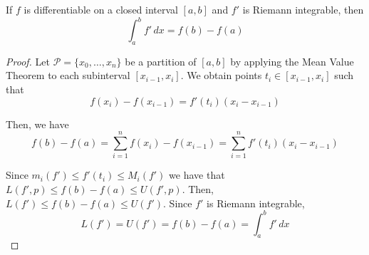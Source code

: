 \begin{theorem}
    If $f$ is differentiable on a closed interval $[a, b]$ and $f'$ is Riemann integrable, then $$\int_a^b f' \, dx = f(b) - f(a)$$
\end{theorem}
\begin{proof}
    Let $\mathcal{P} = \{x_0, \ldots, x_n\}$ be a partition of $[a, b]$ by applying the Mean Value Theorem to each subinterval $[x_{i - 1}, x_i]$. We obtain points $t_i \in [x_{i - 1}, x_i]$ such that $$f(x_i) - f(x_{i - 1}) = f'(t_i) (x_i - x_{i - 1})$$

    Then, we have $$f(b) - f(a) = \sum_{i = 1}^n f(x_i) - f(x_{i - 1}) = \sum_{i = 1}^n f'(t_i) (x_i - x_{i - 1})$$

    Since $m_i(f') \leq f'(t_i) \leq M_i(f')$ we have that $L(f', p) \leq f(b) - f(a) \leq U(f', p)$. Then, $L(f') \leq f(b) - f(a) \leq U(f')$. Since $f'$ is Riemann integrable, $$L(f') = U(f') = f(b) - f(a) = \int_a^b f' \, dx$$
\end{proof}